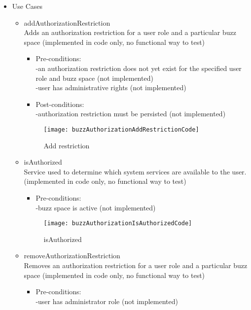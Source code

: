 \begin {itemize}
\item Use Cases
\begin {itemize}
\item {addAuthorizationRestriction}\\
Adds an authorization restriction for a user role and a particular buzz space (implemented in code only, no functional way to test)
\begin {itemize}
\item Pre-conditions:\\
-an authorization restriction does not yet exist for the specified user role and buzz space (not implemented)\\
        -user has administrative rights (not implemented)\\

\item Post-conditions:\\
-authorization restriction must be persisted (not implemented)\\
\end {itemize}

\begin{figure}[h!]
  \centering
    \texttt{[image: buzzAuthorizationAddRestrictionCode]}
    \caption{Add restriction}
\end{figure}


\item {isAuthorized}\\
Service used to determine which system services are available to the user. (implemented in code only, no functional way to test)
\begin {itemize}
\item Pre-conditions: \\
-buzz space is active (not implemented)\\ 
\end{itemize}

\begin{figure}[h!]
  \centering
    \texttt{[image: buzzAuthorizationIsAuthorizedCode]}
    \caption{isAuthorized}
\end{figure}

\item {removeAuthorizationRestriction}\\
Removes an authorization restriction for a user role and a particular buzz space (implemented in code only, no functional way to test)
\begin {itemize}
\item Pre-conditions: \\
-user has administrator role (not implemented)\\
        

\end{itemize}
\end{itemize}
\end{itemize}
